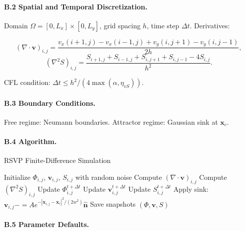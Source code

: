 \documentclass[12pt]{article}
\begin{document}
\paragraph{B.2 Spatial and Temporal Discretization.}

Domain \(\Omega = [0, L_x] \times [0, L_y]\), grid spacing \(h\), time step \(\Delta t\). Derivatives:

\[
(\nabla \cdot \mathbf{v})_{i,j} = \frac{v_x(i+1,j) - v_x(i-1,j) + v_y(i,j+1) - v_y(i,j-1)}{2h},
\]
\[
(\nabla^2 S)_{i,j} = \frac{S_{i+1,j} + S_{i-1,j} + S_{i,j+1} + S_{i,j-1} - 4 S_{i,j}}{h^2}.
\]

CFL condition: \(\Delta t \leq h^2 / (4 \max(\alpha, \eta_{vS}))\).

\paragraph{B.3 Boundary Conditions.}

Free regime: Neumann boundaries. Attractor regime: Gaussian sink at \(\mathbf{x}_c\).

\paragraph{B.4 Algorithm.}

\begin{algorithm}
\caption{RSVP Finite-Difference Simulation}
\begin{algorithmic}[1]
\State Initialize \(\Phi_{i,j}\), \(\mathbf{v}_{i,j}\), \(S_{i,j}\) with random noise
  \State Compute \((\nabla \cdot \mathbf{v})_{i,j}\)
  \State Compute \((\nabla^2 S)_{i,j}\)
  \State Update \(\Phi_{i,j}^{t+\Delta t}\)
  \State Update \(\mathbf{v}_{i,j}^{t+\Delta t}\)
  \State Update \(S_{i,j}^{t+\Delta t}\)
    \State Apply sink: \(\mathbf{v}_{i,j} \mathrel{-{=}} A e^{-|\mathbf{x}_{i,j} - \mathbf{x}_c|^2 / (2 w^2)} \mathbf{\hat{n}}\)
  \EndIf
    \State Save snapshots \((\Phi, \mathbf{v}, S)\)
  \EndIf
\EndFor
\end{algorithmic}
\end{algorithm}

\paragraph{B.5 Parameter Defaults.}
\end{document}
